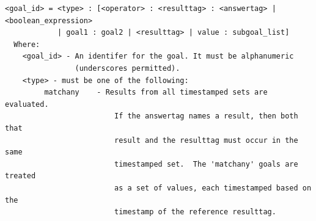 \documentclass[12pt]{article}
\begin{document}
\begin{verbatim}
<goal_id> = <type> : [<operator> : <resulttag> : <answertag> | <boolean_expression> 
            | goal1 : goal2 | <resulttag> | value : subgoal_list]
  Where: 
    <goal_id> - An identifer for the goal. It must be alphanumeric 
                (underscores permitted).
    <type> - must be one of the following:
         matchany    - Results from all timestamped sets are evaluated.
                         If the answertag names a result, then both that 
                         result and the resulttag must occur in the same 
                         timestamped set.  The 'matchany' goals are treated 
                         as a set of values, each timestamped based on the 
                         timestamp of the reference resulttag.
                      

\end{verbatim}
\end{document}
